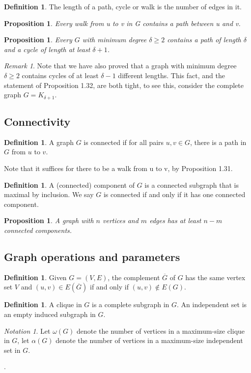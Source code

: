 \documentclass[11pt, fleqn, a4paper, landscape]{article}
\theoremstyle{plain} %
\newtheorem{pro}[thm]{Proposition}
\theoremstyle{remark} %
\newtheorem{rem}[thm]{Remark}
\newtheorem{nota}[thm]{Notation}
\theoremstyle{definition} %
\newtheorem{defi}[thm]{Definition}
\begin{document}
\begin{multicols}{3}
\begin{defi}
The length of a path, cycle or walk is the number of edges in it.
\end{defi}
\addtocounter{thm}{1}
\begin{pro}
Every walk from u to v in G contains a path between u and v.
\end{pro}

\begin{pro}
Every $G$ with minimum degree $ \delta\ge 2$ contains a path of length $\delta$ and a cycle of length at least $\delta + 1$.
\end{pro}

\begin{rem}
Note that we have also proved that a graph with minimum degree $\delta\ge 2$ contains cycles of at least $\delta-1$ different lengths. This fact, and the statement of Proposition 1.32, are both tight, to see this, consider the complete graph $G = K_{\delta+1}$.
\end{rem} 

\subsection{Connectivity}

\begin{defi}
A graph $G$ is connected if for all pairs $u, v \in G$, there is a path in $G$ from $u$ to $v$.
\end{defi}
Note that it suffices for there to be a walk from u to v, by Proposition 1.31.
\addtocounter{thm}{1}
\begin{defi}
A (connected) component of $G$ is a connected subgraph that is maximal by inclusion. We say $G$ is connected if and only if it has one connected component.
\end{defi}
\addtocounter{thm}{1}
\begin{pro}
A graph with $n$ vertices and $m$ edges has at least $n-m$ connected components.
\end{pro}

\subsection{Graph operations and parameters}

\begin{defi}
Given $G = (V,E)$, the complement $\overline{G}$ of $G$ has the same vertex set $V$ and $(u, v) \in E(\overline{G})$ if and only if $(u, v) \notin E(G)$.
\end{defi}
\addtocounter{thm}{1}
\begin{defi}
A clique in $G$ is a complete subgraph in $G$. An independent set is an empty
induced subgraph in $G$.
\end{defi}
\addtocounter{thm}{1}
\begin{nota}
Let $\omega(G)$ denote the number of vertices in a maximum-size clique in $G$, let $\alpha(G)$ denote the number of vertices in a maximum-size independent set in $G$.
\end{nota}. 


\end{multicols}
\end{document}
